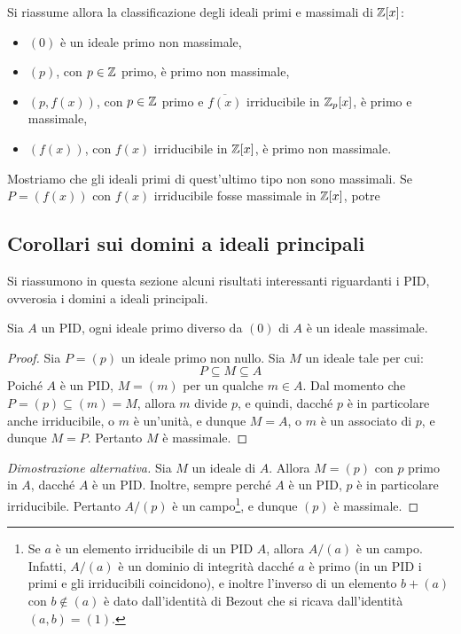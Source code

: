 \documentclass[11pt]{scrartcl}
\begin{document}
	Si riassume allora la classificazione degli ideali primi e massimali di $\mathbb Z[x]$:
	\begin{itemize}
		\item $(0)$ è un ideale primo non massimale,
		\item $(p)$, con $p \in \mathbb Z$ primo, è primo non massimale,
		\item $(p, f(x))$, con $p \in \mathbb Z$ primo e $\overline{f(x)}$ irriducibile
		in $\mathbb Z_p[x]$, è primo e massimale,
		\item $(f(x))$, con $f(x)$ irriducibile in $\mathbb Z[x]$, è primo non massimale.
	\end{itemize}
	
	
	
	Mostriamo che gli ideali primi di quest'ultimo tipo non sono massimali.
	Se $P = (f(x))$ con $f(x)$ irriducibile fosse massimale in $\mathbb Z[x]$, potre
	
	\newpage
	
	\subsection{Corollari sui domini a ideali principali}
	
	Si riassumono in questa sezione alcuni risultati interessanti riguardanti
	i PID, ovverosia i domini a ideali principali.
	
	\begin{proposition}
		\label{prop:pid_ideali}
		Sia $A$ un PID, ogni ideale primo diverso da $(0)$ di $A$ è un ideale 
		massimale.
	\end{proposition}
	
	\begin{proof}
		Sia $P = (p)$ un ideale primo non nullo. Sia
		$M$ un ideale tale per cui:
		\[
		P \subseteq M \subseteq A
		\]
		Poiché $A$ è un PID, $M = (m)$ per un qualche $m \in A$. Dal momento che
		$P = (p) \subseteq (m) = M$, allora $m$ divide $p$, e quindi, dacché
		$p$ è in particolare anche irriducibile, o $m$ è
		un'unità, e dunque $M = A$, o $m$ è un associato di $p$, e dunque $M = P$.
		Pertanto $M$ è massimale.
	\end{proof}
	
	\begin{proof}[Dimostrazione alternativa]
		Sia $M$ un ideale di $A$. Allora $M = (p)$ con $p$ primo in $A$, dacché
		$A$ è un PID. Inoltre, sempre perché $A$ è un PID, $p$
		è in particolare irriducibile. Pertanto $A/(p)$ è un campo\footnote{
			Se $a$ è un elemento irriducibile di un PID $A$, allora
			$A/(a)$ è un campo. Infatti, $A/(a)$ è un dominio di integrità
			dacché $a$ è primo (in un PID i primi e gli irriducibili coincidono),
			e inoltre l'inverso di un elemento $b + (a)$ con $b \notin (a)$ è dato dall'identità
			di Bezout che si ricava dall'identità $(a, b) = (1)$.
		}, e dunque
		$(p)$ è massimale.
	\end{proof}
	
\end{document}
